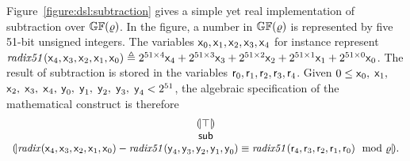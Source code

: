Figure~\ref{figure:dsl:subtraction} gives a simple yet real
implementation of subtraction over $\mathbb{GF}(\varrho)$. 
In the figure, a number in $\mathbb{GF}(\varrho)$ 
is represented by five 51-bit unsigned integers. The variables
$\mbox{\textsf{x}}_0, \mbox{\textsf{x}}_1, \mbox{\textsf{x}}_2, \mbox{\textsf{x}}_3,
\mbox{\textsf{x}}_4$ for instance represent 
$\mathit{radix51}(\mbox{\textsf{x}}_4, \mbox{\textsf{x}}_3, \mbox{\textsf{x}}_2,
\mbox{\textsf{x}}_1, \mbox{\textsf{x}}_0) \triangleq
2^{51 \times 4} \mbox{\textsf{x}}_4 + 2^{51 \times 3} \mbox{\textsf{x}}_3 + 
2^{51 \times 2} \mbox{\textsf{x}}_2 + 2^{51 \times 1} \mbox{\textsf{x}}_1 + 
2^{51 \times 0} \mbox{\textsf{x}}_0$. The result of
subtraction is stored in the variables $\mbox{\textsf{r}}_0, \mbox{\textsf{r}}_1,
\mbox{\textsf{r}}_2, \mbox{\textsf{r}}_3, \mbox{\textsf{r}}_4$. 
Given $0 \leq \mbox{\textsf{x}}_0,$ $\mbox{\textsf{x}}_1,$ $\mbox{\textsf{x}}_2,$
$\mbox{\textsf{x}}_3,$ $\mbox{\textsf{x}}_4,$ $\mbox{\textsf{y}}_0,$ $\mbox{\textsf{y}}_1,$
$\mbox{\textsf{y}}_2,$ $\mbox{\textsf{y}}_3,$ $\mbox{\textsf{y}}_4 < 2^{51}$, 
the algebraic specification of the mathematical construct is therefore
\[
\begin{array}{c}
{(\!|}{\top}{|\!)}\\
\mbox{\textsf{sub}}\\
{(\!|}{\mathit{radix}(\mbox{\textsf{x}}_4, \mbox{\textsf{x}}_3, \mbox{\textsf{x}}_2,
\mbox{\textsf{x}}_1, \mbox{\textsf{x}}_0) -
\mathit{radix51}(\mbox{\textsf{y}}_4, \mbox{\textsf{y}}_3, \mbox{\textsf{y}}_2,
\mbox{\textsf{y}}_1, \mbox{\textsf{y}}_0)
\equiv
\mathit{radix51}(\mbox{\textsf{r}}_4, \mbox{\textsf{r}}_3, \mbox{\textsf{r}}_2,
\mbox{\textsf{r}}_1, \mbox{\textsf{r}}_0)
\mod {\varrho}
}{|\!)}.
\end{array}
\]

